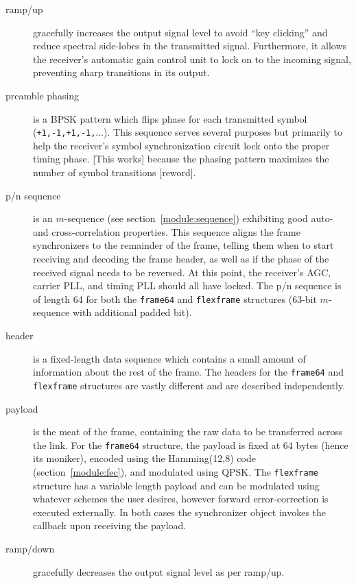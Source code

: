 \begin{description}
\item[{\sf ramp/up}]
    gracefully increases the output signal level to avoid ``key clicking'' and
    reduce spectral side-lobes in the transmitted signal.
    Furthermore, it allows the receiver's automatic gain control unit to
    lock on to the incoming signal, preventing sharp transitions in its
    output.
\item[{\sf preamble phasing}]
    is a BPSK pattern which flips phase for each transmitted symbol
    ({\tt +1,-1,+1,-1,$\ldots$}).
    This sequence serves several purposes but primarily to help the receiver's
    symbol synchronization circuit lock onto the proper timing phase.
    [This works] because the phasing pattern maximizes the number of symbol
    transitions [reword].
\item[{\sf p/n sequence}]
    is an $m$-sequence (see section~\ref{module:sequence}) exhibiting good
    auto- and cross-correlation properties.
    This sequence aligns the frame synchronizers to the remainder of the
    frame, telling them when to start receiving and decoding the frame header,
    as well as if the phase of the received signal needs to be reversed.
    At this point, the receiver's AGC, carrier PLL, and timing PLL should all
    have locked.
    The p/n sequence is of length 64 for both the {\tt frame64} and
    {\tt flexframe} structures (63-bit $m$-sequence with additional padded
    bit).
\item[{\sf header}]
    is a fixed-length data sequence which contains a small amount of
    information about the rest of the frame.
    The headers for the {\tt frame64} and {\tt flexframe} structures are
    vastly different and are described independently.
\item[{\sf payload}]
    is the meat of the frame, containing the raw data to be transferred across
    the link.
    For the {\tt frame64} structure, the payload is fixed at 64 bytes (hence
    its moniker), encoded using the Hamming(12,8) code
    (section~\ref{module:fec}), and modulated using QPSK.
    The {\tt flexframe} structure has a variable length payload and can be
    modulated using whatever schemes the user desires, however forward
    error-correction is executed externally.
    In both cases the synchronizer object invokes the callback upon receiving
    the payload.
\item[{\sf ramp/down}]
    gracefully decreases the output signal level as per ramp/up.
\end{description}

